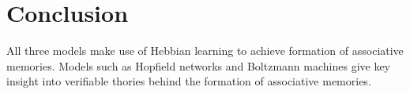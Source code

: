\section{Conclusion}

All three models make use of Hebbian learning to achieve formation of associative memories. Models such as Hopfield networks and Boltzmann machines give key insight into verifiable thories behind the formation of associative memories.







